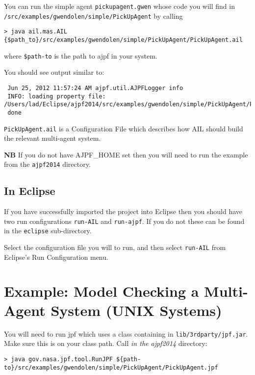 You can run the simple agent \texttt{pickupagent.gwen} whose code you will find in \texttt{/src/examples/gwendolen/simple/PickUpAgent} by calling

\noindent \begin{lstlisting}[basicstyle=\tiny]
> java ail.mas.AIL {$path_to}/src/examples/gwendolen/simple/PickUpAgent/PickUpAgent.ail
\end{lstlisting}
\medskip

\noindent where \texttt{\${path-to}} is the path to ajpf in your system.

You should see output similar to:

\noindent \begin{lstlisting}
 Jun 25, 2012 11:57:24 AM ajpf.util.AJPFLogger info
 INFO: loading property file: /Users/lad/Eclipse/ajpf2014/src/examples/gwendolen/simple/PickUpAgent/PickUpAgent.ail
 done
\end{lstlisting}
\medskip
 
\texttt{PickUpAgent.ail} is a Configuration File which describes how AIL should build the relevant multi-agent system.

{\bf NB}  If you do not have AJPF\_HOME set then you will need to run the example from the \texttt{ajpf2014} directory.

\subsection{In Eclipse}

If you have successfully imported the project into Eclipse then you should have two run configurations \texttt{run-AIL} and \texttt{run-ajpf}.  If you do not these can be found in the \texttt{eclipse} sub-directory.

Select the configuration file you will to run, and then select \texttt{run-AIL} from Eclipse's Run Configuration menu.


\section{Example: Model Checking a Multi-Agent System (UNIX Systems)}

You will need to run jpf which uses a class containing in \texttt{lib/3rdparty/jpf.jar}.  Make sure this is on your class path.  Call \emph{in the ajpf2014} directory:

\noindent \begin{lstlisting}[basicstyle=\tiny]
> java gov.nasa.jpf.tool.RunJPF ${path-to}/src/examples/gwendolen/simple/PickUpAgent/PickUpAgent.jpf
\end{lstlisting}
\medskip

